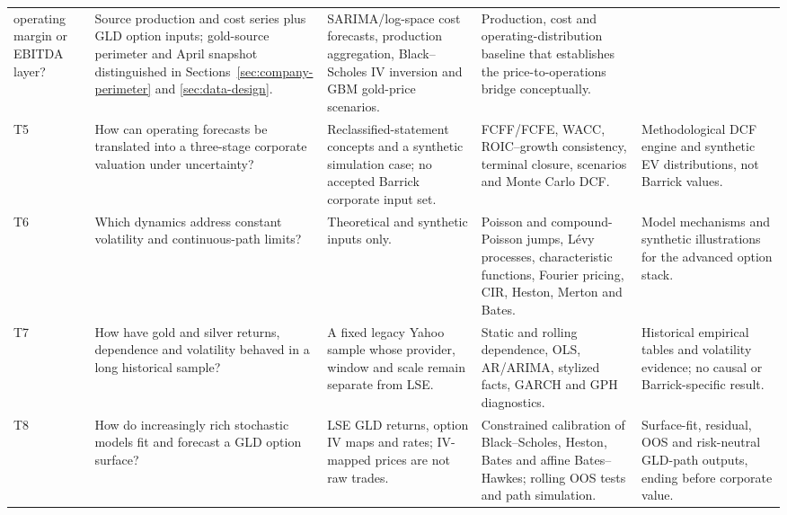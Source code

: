 \begin{table}[H]
\begin{tabularx}{\textwidth}{@{}p{0.85cm}p{2.32cm}X X X@{}}
operating margin or EBITDA layer? & Source production and cost series plus GLD
option inputs; gold-source perimeter and April snapshot distinguished in
Sections~\ref{sec:company-perimeter} and \ref{sec:data-design}. & SARIMA/log-space
cost forecasts, production aggregation, Black--Scholes IV inversion and GBM
gold-price scenarios. & Production, cost and operating-distribution baseline
that establishes the price-to-operations bridge conceptually. \\
T5 & How can operating forecasts be translated into a three-stage corporate
valuation under uncertainty? & Reclassified-statement concepts and a synthetic
simulation case; no accepted Barrick corporate input set. & FCFF/FCFE, WACC,
ROIC--growth consistency, terminal closure, scenarios and Monte Carlo DCF. &
Methodological DCF engine and synthetic EV distributions, not Barrick values. \\
T6 & Which dynamics address constant volatility and continuous-path limits?
& Theoretical and synthetic inputs only. & Poisson and compound-Poisson jumps,
L\'evy processes, characteristic functions, Fourier pricing, CIR, Heston,
Merton and Bates. & Model mechanisms and synthetic illustrations for the
advanced option stack. \\
T7 & How have gold and silver returns, dependence and volatility behaved in a
long historical sample? & A fixed legacy Yahoo sample whose provider, window
and scale remain separate from LSE. & Static and rolling dependence, OLS,
AR/ARIMA, stylized facts, GARCH and GPH diagnostics. & Historical empirical
tables and volatility evidence; no causal or Barrick-specific result. \\
T8 & How do increasingly rich stochastic models fit and forecast a GLD option
surface? & LSE GLD returns, option IV maps and rates; IV-mapped prices are not
raw trades. & Constrained calibration of Black--Scholes, Heston, Bates and
affine Bates--Hawkes; rolling OOS tests and path simulation. & Surface-fit,
residual, OOS and risk-neutral GLD-path outputs, ending before corporate value. \\
\bottomrule
\end{tabularx}
\end{table}

